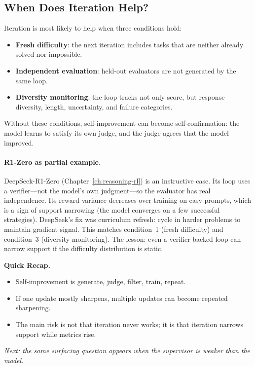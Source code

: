 \subsection{When Does Iteration Help?}

Iteration is most likely to help when three conditions hold:

\begin{itemize}[nosep]
  \item \textbf{Fresh difficulty}: the next iteration includes tasks that are neither already solved nor impossible.
  \item \textbf{Independent evaluation}: held-out evaluators are not generated by the same loop.
  \item \textbf{Diversity monitoring}: the loop tracks not only score, but response diversity, length, uncertainty, and failure categories.
\end{itemize}

Without these conditions, self-improvement can become self-confirmation: the model learns to satisfy its own judge, and the judge agrees that the model improved.

\paragraph{R1-Zero as partial example.} DeepSeek-R1-Zero (Chapter~\ref{ch:reasoning-rl}) is an instructive case. Its loop uses a verifier---not the model's own judgment---so the evaluator has real independence. Its reward variance decreases over training on easy prompts, which is a sign of support narrowing (the model converges on a few successful strategies). DeepSeek's fix was curriculum refresh: cycle in harder problems to maintain gradient signal. This matches condition~1 (fresh difficulty) and condition~3 (diversity monitoring). The lesson: even a verifier-backed loop can narrow support if the difficulty distribution is static.

\begin{quickrecap}
\textbf{Quick Recap.}
\begin{itemize}[nosep,leftmargin=1.5em]
  \item Self-improvement is generate, judge, filter, train, repeat.
  \item If one update mostly sharpens, multiple updates can become repeated sharpening.
  \item The main risk is not that iteration never works; it is that iteration narrows support while metrics rise.
\end{itemize}
\textit{Next: the same surfacing question appears when the supervisor is weaker than the model.}
\end{quickrecap}


